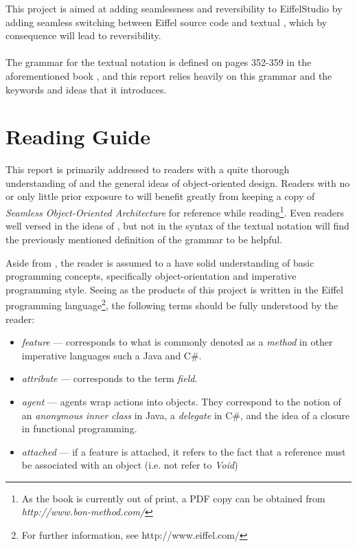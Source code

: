 This project is aimed at adding seamlessness and reversibility to EiffelStudio by adding seamless switching between Eiffel source code and textual \bon{}, which by consequence will lead to reversibility.

\paragraph{}
The grammar for the textual \bon{} notation is defined on pages 352-359 in the aforementioned book \cite{walden1995}, and this report relies heavily on this grammar and the keywords and ideas that it introduces.

\section{Reading Guide}
This report is primarily addressed to readers with a quite thorough understanding of \bon{} and the general ideas of object-oriented design. Readers with no or only little prior exposure to \bon{} will benefit greatly from keeping a copy of \textit{Seamless Object-Oriented Architecture} for reference while reading\footnote{As the book is currently out of print, a PDF copy can be obtained from \textit{http://www.bon-method.com/}}. Even readers well versed in the ideas of \bon{}, but not in the syntax of the textual notation will find the previously mentioned definition of the grammar to be helpful.

Aside from \bon{}, the reader is assumed to a have solid understanding of basic programming concepts, specifically object-orientation and imperative programming style. Seeing as the products of this project is written in the Eiffel programming language\footnote{For further information, see http://www.eiffel.com/}, the following terms should be fully understood by the reader:
\begin{itemize}
\item \textit{feature} --- corresponds to what is commonly denoted as a \textit{method} in other imperative languages such a Java and C\#.
\item \textit{attribute} --- corresponds to the term \textit{field}.
\item \textit{agent} --- agents wrap actions into objects. They correspond to the notion of an \textit{anonymous inner class} in Java, a \textit{delegate} in C\#, and the idea of a closure in functional programming.
\item \textit{attached} --- if a feature is attached, it refers to the fact that a reference must be associated with an object (i.e. not refer to \textit{Void})
\end{itemize} 

